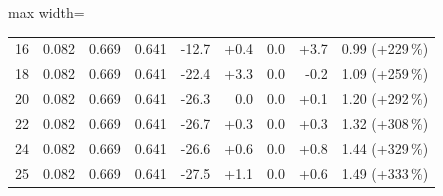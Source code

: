 \begin{table}[htbp]
\begin{adjustbox}{max width=\textwidth}
\begin{tabular}{r rrr rrrr r}
        16 & 0.082 & 0.669 & 0.641 & -12.7 & +0.4 & 0.0 & +3.7 & 0.99 (+229\,\%) \\
        18 & 0.082 & 0.669 & 0.641 & -22.4 & +3.3 & 0.0 & -0.2 & 1.09 (+259\,\%) \\
        20 & 0.082 & 0.669 & 0.641 & -26.3 & 0.0 & 0.0 & +0.1 & 1.20 (+292\,\%) \\
        22 & 0.082 & 0.669 & 0.641 & -26.7 & +0.3 & 0.0 & +0.3 & 1.32 (+308\,\%) \\
        24 & 0.082 & 0.669 & 0.641 & -26.6 & +0.6 & 0.0 & +0.8 & 1.44 (+329\,\%) \\
        25 & 0.082 & 0.669 & 0.641 & -27.5 & +1.1 & 0.0 & +0.6 & 1.49 (+333\,\%) \\
        \bottomrule
    \end{tabular}
    \end{adjustbox}
\end{table}
